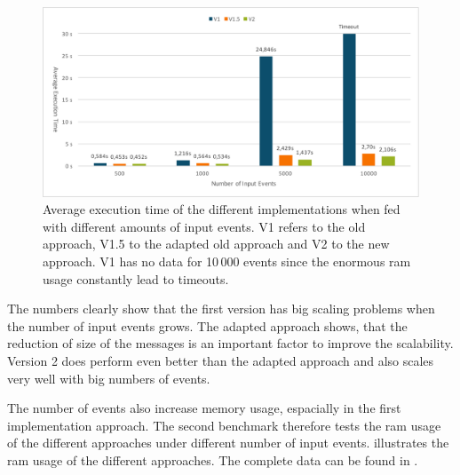 \begin{figure}
  \includegraphics[width=\textwidth]{gfx/runtime_num_events_benchmark}
  \caption[Average execution time of the different implementations when fed with different amounts of input events.]{Average execution time of the different implementations when fed with different amounts of input events. V1 refers to the old approach, V1.5 to the adapted old approach and V2 to the new approach. V1 has no data for 10\,000 events since the enormous \gls{ram} usage constantly lead to timeouts.}
\label{fig:chap_eval:runtime_num_events}
\end{figure}

The numbers clearly show that the first version has big scaling problems when the number of input events grows.
The adapted approach shows, that the reduction of size of the messages is an important factor to improve the scalability.
Version 2 does perform even better than the adapted approach and also scales very well with big numbers of events.

The number of events also increase memory usage, espacially in the first implementation approach.
The second benchmark therefore tests the \gls{ram} usage of the different approaches under different number of input events.
 illustrates the \gls{ram} usage of the different approaches.
The complete data can be found in .

